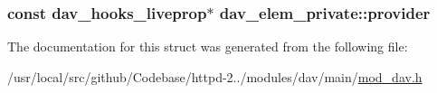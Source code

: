 \subsubsection[{\texorpdfstring{provider}{provider}}]{\setlength{\rightskip}{0pt plus 5cm}const {\bf dav\+\_\+hooks\+\_\+liveprop}$\ast$ dav\+\_\+elem\+\_\+private\+::provider}\hypertarget{structdav__elem__private_a5e9b2bd2455d88e29e87f04e495adf1c}{}\label{structdav__elem__private_a5e9b2bd2455d88e29e87f04e495adf1c}


The documentation for this struct was generated from the following file\+:\begin{DoxyCompactItemize}
\item 
/usr/local/src/github/\+Codebase/httpd-\/2../modules/dav/main/\hyperlink{mod__dav_8h}{mod\+\_\+dav.\+h}\end{DoxyCompactItemize}
